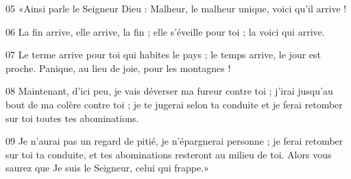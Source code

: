 
05 «Ainsi parle le Seigneur Dieu : Malheur, le malheur unique, voici qu’il arrive !

06 La fin arrive, elle arrive, la fin ; elle s’éveille pour toi ; la voici qui arrive.

07 Le terme arrive pour toi qui habites le pays ; le temps arrive, le jour est proche. Panique, au lieu de joie, pour les montagnes !

08 Maintenant, d’ici peu, je vais déverser ma fureur contre toi ; j’irai jusqu’au bout de ma colère contre toi ; je te jugerai selon ta conduite et je ferai retomber sur toi toutes tes abominations.

09 Je n’aurai pas un regard de pitié, je n’épargnerai personne ; je ferai retomber sur toi ta conduite, et tes abominations resteront au milieu de toi. Alors vous saurez que Je suis le Seigneur, celui qui frappe.»
